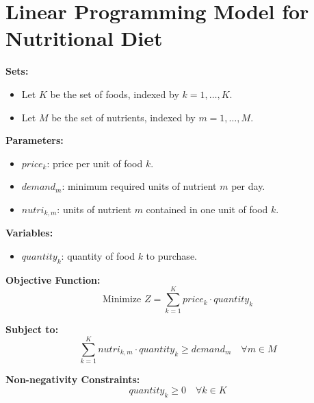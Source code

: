 \documentclass{article}
\begin{document}
\section*{Linear Programming Model for Nutritional Diet}

\textbf{Sets:}
\begin{itemize}
    \item Let $K$ be the set of foods, indexed by $k = 1, \ldots, K$.
    \item Let $M$ be the set of nutrients, indexed by $m = 1, \ldots, M$.
\end{itemize}

\textbf{Parameters:}
\begin{itemize}
    \item $price_k$: price per unit of food $k$.
    \item $demand_m$: minimum required units of nutrient $m$ per day.
    \item $nutri_{k,m}$: units of nutrient $m$ contained in one unit of food $k$.
\end{itemize}

\textbf{Variables:}
\begin{itemize}
    \item $quantity_k$: quantity of food $k$ to purchase.
\end{itemize}

\textbf{Objective Function:}
\[
\text{Minimize } Z = \sum_{k=1}^{K} price_k \cdot quantity_k
\]

\textbf{Subject to:}
\[
\sum_{k=1}^{K} nutri_{k,m} \cdot quantity_k \geq demand_m \quad \forall m \in M
\]

\textbf{Non-negativity Constraints:}
\[
quantity_k \geq 0 \quad \forall k \in K
\]
\end{document}

